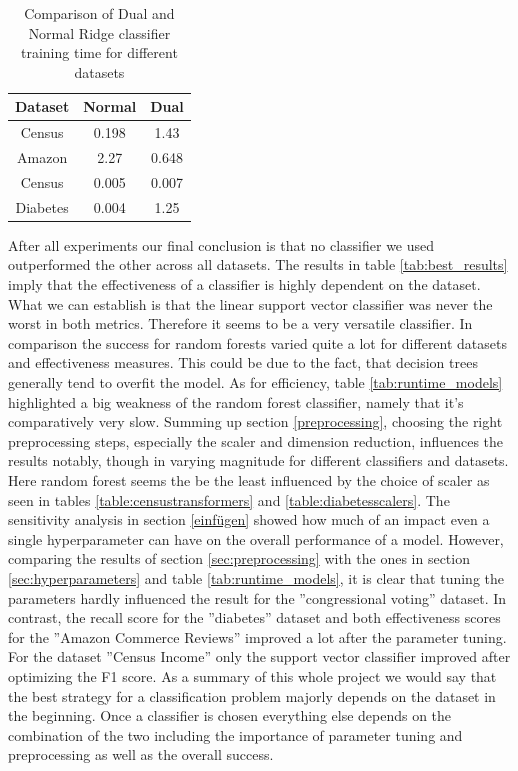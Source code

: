 \documentclass[a4paper,10pt]{article}
\begin{document}
\begin{table}[h!]
\centering
\begin{tabular}{|c|c|c|}
\hline
\textbf{Dataset} & \textbf{Normal} & \textbf{Dual} \\
\hline
Census & 0.198 & 1.43 \\
\hline
Amazon & 2.27 & 0.648 \\
\hline
Census & 0.005 & 0.007 \\
\hline
Diabetes & 0.004 & 1.25 \\
\hline
\end{tabular}
\vspace{0.3cm}
\caption{Comparison of Dual and Normal Ridge classifier training time for different datasets}
\label{tab:dual_comparison}
\end{table}
After all experiments our final conclusion is that no classifier we used outperformed the other across all
datasets. The results in table \ref{tab:best_results} imply that the effectiveness of a classifier is highly dependent on the
dataset. What we can establish is that the linear support vector classifier was never the worst in both
metrics. Therefore it seems to be a very versatile classifier. In comparison the success for random forests
varied quite a lot for different datasets and effectiveness measures. This could be due to the fact, that
decision trees generally tend to overfit the model. As for efficiency, table \ref{tab:runtime_models} highlighted a big weakness of
the random forest classifier, namely that it’s comparatively very slow. Summing up section \ref{preprocessing}, choosing
the right preprocessing steps, especially the scaler and dimension reduction, influences the results notably,
though in varying magnitude for different classifiers and datasets. Here random forest seems the be the
least influenced by the choice of scaler as seen in tables \ref{table:censustransformers} and \ref{table:diabetesscalers}. The sensitivity analysis in section \ref{einfügen}
showed how much of an impact even a single hyperparameter can have on the overall performance of a
model. However, comparing the results of section \ref{sec:preprocessing} with the ones in section \ref{sec:hyperparameters} and table \ref{tab:runtime_models}, it is clear that
tuning the parameters hardly influenced the result for the ”congressional voting” dataset. In contrast, the
recall score for the ”diabetes” dataset and both effectiveness scores for the ”Amazon Commerce Reviews”
improved a lot after the parameter tuning. For the dataset ”Census Income” only the support vector
classifier improved after optimizing the F1 score. As a summary of this whole project we would say that
the best strategy for a classification problem majorly depends on the dataset in the beginning. Once a
classifier is chosen everything else depends on the combination of the two including the importance of
parameter tuning and preprocessing as well as the overall success.
\end{document}
